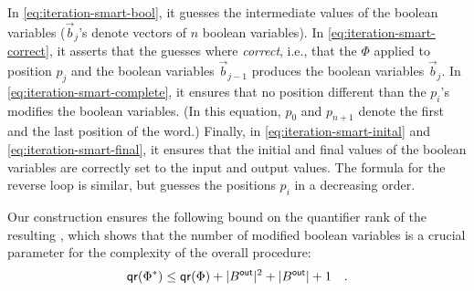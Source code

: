 In \cref{eq:iteration-smart-bool}, it guesses the intermediate
values of the boolean variables ($\vec{b}_j$'s denote vectors of $n$ boolean variables). 
In \cref{eq:iteration-smart-correct}, it asserts that the guesses where \emph{correct}, 
i.e., that the  $\Phi$ applied to position $p_j$ 
and the boolean variables $\vec{b}_{j-1}$ produces the boolean variables $\vec{b}_j$.
In \cref{eq:iteration-smart-complete}, it ensures that no position different than the $p_i$'s 
modifies the boolean variables.
(In this equation, $p_0$ and $p_{n+1}$ denote the first and the last position of the word.)
 Finally, in \cref{eq:iteration-smart-inital} and \cref{eq:iteration-smart-final},
it ensures that the initial and final values of the boolean variables are correctly set to the input and output values.
The formula for the reverse loop is similar, but guesses the positions $p_i$ in a decreasing order.

Our construction ensures the following bound on the quantifier rank of the resulting , 
which shows that the number of modified boolean variables is a crucial parameter for the complexity of the overall procedure:
\begin{equation}
    \label{eq:iteration-smart-quantifier-rank}
    \qrank(\Phi^*) 
    \leq \qrank(\Phi) 
    + |B^{\mathsf{out}}|^2
    + |B^{\mathsf{out}}|
    + 1 \quad .
\end{equation}
